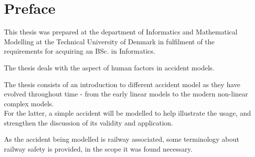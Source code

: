 \chapter{Preface}

This thesis was prepared at the department of Informatics and Mathematical Modelling at the Technical University of Denmark in fulfilment of the requirements for acquiring an BSc. in Informatics. 

The thesis deals with the aspect of human factors in accident models.

The thesis consists of an introduction to different accident model as they have evolved throughout time - from the early linear models to the modern non-linear complex models.\\
For the latter, a simple accident will be modelled to help illustrate the usage, and strengthen the discussion of its validity and application.

As the accident being modelled is railway associated, some terminology about railway safety is provided, in the scope it was found necessary.


